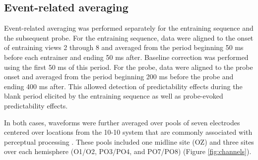 \documentclass[dwyatte_dissertation.tex]{subfiles}
\begin{document}
\subsection{Event-related averaging}
Event-related averaging was performed separately for the entraining sequence and the subsequent probe. For the entraining sequence, data were aligned to the onset of entraining views 2 through 8 and averaged from the period beginning 50 ms before each entrainer and ending 50 ms after. Baseline correction was performed using the first 50 ms of this period. For the probe, data were aligned to the probe onset and averaged from the period beginning 200 ms before the probe and ending 400 ms after. This allowed detection of predictability effects during the blank period elicited by the entraining sequence as well as probe-evoked predictability effects.

In both cases, waveforms were further averaged over pools of seven electrodes centered over locations from the 10-10 system that are commonly associated with perceptual processing \cite[e.g.,]{DohertyRaoMesulamEtAl05,RohenkohlNobre11}. These pools included one midline site (OZ) and three sites over each hemisphere (O1/O2, PO3/PO4, and PO7/PO8) (Figure \ref{fig:channels}).
\end{document}
